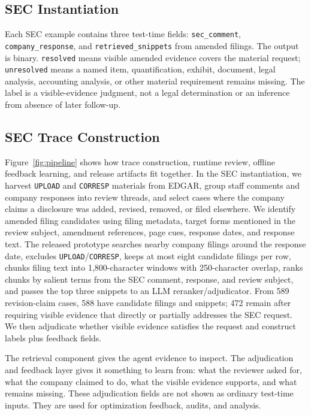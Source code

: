 \documentclass[11pt]{article}
\begin{document}
\subsection{SEC Instantiation}

Each SEC example contains three test-time fields: \texttt{sec\_comment}, \texttt{company\_response}, and \texttt{retrieved\_snippets} from amended filings. The output is binary. \texttt{resolved} means visible amended evidence covers the material request; \texttt{unresolved} means a named item, quantification, exhibit, document, legal analysis, accounting analysis, or other material requirement remains missing. The label is a visible-evidence judgment, not a legal determination or an inference from absence of later follow-up.

\subsection{SEC Trace Construction}

Figure~\ref{fig:pipeline} shows how trace construction, runtime review, offline feedback learning, and release artifacts fit together. In the SEC instantiation, we harvest \texttt{UPLOAD} and \texttt{CORRESP} materials from EDGAR, group staff comments and company responses into review threads, and select cases where the company claims a disclosure was added, revised, removed, or filed elsewhere. We identify amended filing candidates using filing metadata, target forms mentioned in the review subject, amendment references, page cues, response dates, and response text. The released prototype searches nearby company filings around the response date, excludes \texttt{UPLOAD}/\texttt{CORRESP}, keeps at most eight candidate filings per row, chunks filing text into 1,800-character windows with 250-character overlap, ranks chunks by salient terms from the SEC comment, response, and review subject, and passes the top three snippets to an LLM reranker/adjudicator. From 589 revision-claim cases, 588 have candidate filings and snippets; 472 remain after requiring visible evidence that directly or partially addresses the SEC request. We then adjudicate whether visible evidence satisfies the request and construct labels plus feedback fields.

The retrieval component gives the agent evidence to inspect. The adjudication and feedback layer gives it something to learn from: what the reviewer asked for, what the company claimed to do, what the visible evidence supports, and what remains missing. These adjudication fields are not shown as ordinary test-time inputs. They are used for optimization feedback, audits, and analysis.
\end{document}
